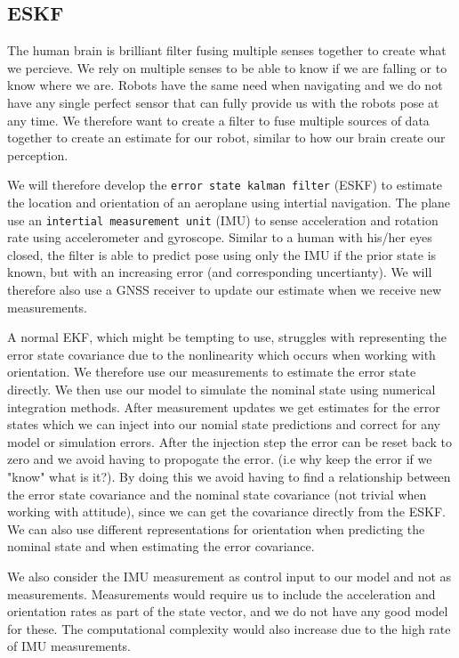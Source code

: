 \subsection{ESKF}
The human brain is brilliant filter fusing multiple senses together to create what we percieve. We rely on multiple senses to be able to know if we are falling or to know where we are. 
Robots have the same need when navigating and we do not have any single perfect sensor that can fully provide us with the robots pose at any time. We therefore want to create a filter to fuse multiple sources of data together to create an estimate for our robot, similar to how our brain create our perception.

We will therefore develop the \texttt{error state kalman filter} (ESKF) to estimate the location and orientation of an aeroplane using intertial navigation. The plane use an \texttt{intertial measurement unit} (IMU) to sense acceleration and rotation rate using accelerometer and gyroscope. Similar to a human with his/her eyes closed, the filter is able to predict pose using only the IMU if the prior state is known, but with an increasing error (and corresponding uncertianty). We will therefore also use a GNSS receiver to update our estimate when we receive new measurements. 

A normal EKF, which might be tempting to use, struggles with representing the error state covariance due to the nonlinearity which occurs when working with orientation. We therefore use our measurements to estimate the error state directly. We then use our model to simulate the nominal state using numerical integration methods. After measurement updates we get estimates for the error states which we can inject into our nomial state predictions and correct for any model or simulation errors. After the injection step the error can be reset back to zero and we avoid having to propogate the error. (i.e why keep the error if we "know" what is it?). By doing this we avoid having to find a relationship between the error state covariance and the nominal state covariance (not trivial when working with attitude), since we can get the covariance directly from the ESKF. We can also use different representations for orientation when predicting the nominal state and when estimating the error covariance. 

We also consider the IMU measurement as control input to our model and not as measurements. Measurements would require us to include the acceleration and orientation rates as part of the state vector, and we do not have any good model for these. The computational complexity would also increase due to the high rate of IMU measurements.